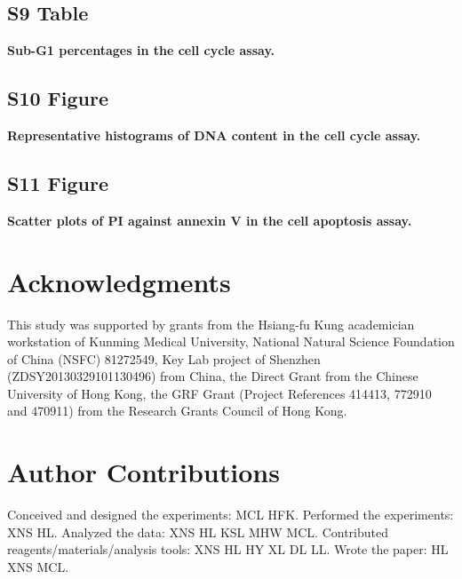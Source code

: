 \documentclass[10pt,letterpaper]{article}
\begin{document}
\subsection*{S9 Table}
\label{S9_Table}
{\bf Sub-G1 percentages in the cell cycle assay.}%

\subsection*{S10 Figure}
\label{S10_Figure}
{\bf Representative histograms of DNA content in the cell cycle assay.}%

\subsection*{S11 Figure}
\label{S11_Figure}
{\bf Scatter plots of PI against annexin V in the cell apoptosis assay.}%

\section*{Acknowledgments}

This study was supported by grants from the Hsiang-fu Kung academician workstation of Kunming Medical University, National Natural Science Foundation of China (NSFC) 81272549, Key Lab project of Shenzhen (ZDSY20130329101130496) from China, the Direct Grant from the Chinese University of Hong Kong, the GRF Grant (Project References 414413, 772910 and 470911) from the Research Grants Council of Hong Kong.

\section*{Author Contributions}

Conceived and designed the experiments: MCL HFK. Performed the experiments: XNS HL. Analyzed the data: XNS HL KSL MHW MCL. Contributed reagents/materials/analysis tools: XNS HL HY XL DL LL. Wrote the paper: HL XNS MCL.

\nolinenumbers

%
%
% 




\end{document}
